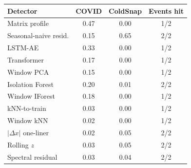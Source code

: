 \begin{tabular}{lccc}
\toprule
Detector & COVID & ColdSnap & Events hit \\
\midrule
Matrix profile & 0.47 & 0.00 & 1/2 \\
Seasonal-naive resid. & 0.15 & 0.65 & 2/2 \\
LSTM-AE & 0.33 & 0.00 & 1/2 \\
Transformer & 0.17 & 0.00 & 1/2 \\
Window PCA & 0.15 & 0.00 & 1/2 \\
Isolation Forest & 0.20 & 0.01 & 2/2 \\
Window IForest & 0.18 & 0.00 & 1/2 \\
kNN-to-train & 0.03 & 0.00 & 1/2 \\
Window kNN & 0.02 & 0.00 & 1/2 \\
$|\Delta x|$ one-liner & 0.02 & 0.05 & 2/2 \\
Rolling $z$ & 0.03 & 0.05 & 2/2 \\
Spectral residual & 0.03 & 0.04 & 2/2 \\
\bottomrule
\end{tabular}

